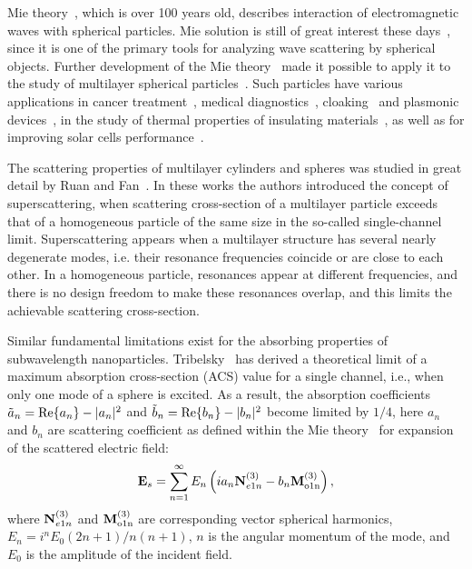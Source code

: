 \documentclass[aps,prl,twocolumn,showpacs,superscriptaddress,groupedaddress]{revtex4-1}  %
\begin{document}
\maketitle %

Mie theory~\cite{Mie-1908}, which is over 100 years old, describes
interaction of electromagnetic waves with spherical particles. Mie
solution is still of great interest these
days~\cite{Suzuki-2008,MacKowski-2012,Lerme-2000,Xu-2005,Li-2006,Gogoi-2010,Santiago-2011},
since it is one of the primary tools for analyzing wave scattering by
spherical objects. Further development of the Mie
theory~\cite{Yang-2003, Pena-scattnlay-2009} made it possible to apply
it to the study of multilayer spherical
particles~\cite{Sheehan-2013,Selmke-2012}.  Such particles have
various applications in cancer treatment~\cite{Zhang-2010,
  Hirsch-2003}, medical diagnostics~\cite{Allain-2002},
cloaking~\cite{Qui-2009, Semouchkina-2013, Ladutenko-2014} and
plasmonic devices~\cite{Martin-2013, Alu-2005}, in the study of
thermal properties of insulating materials~\cite{Xie-2013}, as well as
for improving solar cells performance~\cite{Kameya-2011,Mann-2011}.

The scattering properties of multilayer cylinders and spheres was
studied in great detail by Ruan and Fan~\cite{Fan-2010,Fan-2011}.  In
these works the authors introduced the concept of superscattering,
when scattering cross-section of a multilayer particle exceeds that of
a homogeneous particle of the same size in the so-called
single-channel limit. Superscattering appears when a multilayer
structure has several nearly degenerate modes, i.e. their resonance
frequencies coincide or are close to each other. In a homogeneous
particle, resonances appear at different frequencies, and there is no
design freedom to make these resonances overlap, and this limits the
achievable scattering cross-section.

Similar fundamental limitations exist for the absorbing properties of
subwavelength nanoparticles.  Tribelsky~\cite{Tribelsky-2011} has
derived a theoretical limit of a maximum absorption cross-section
(ACS) value for a single channel, i.e., when only one mode of a sphere
is excited.  As a result, the absorption coefficients $\tilde{a}_n=
{\rm Re}\{a_n\} - |a_n|^2 $ and $\tilde{b}_n= {\rm Re}\{b_n\} -
|b_n|^2 $ become limited by $1/4$, here $a_n$ and $b_n$ are scattering
coefficient as defined within the Mie theory~\cite{Bohren-1983} for
expansion of the scattered electric field:
$$ 
{\rm \mathbf{E}}_s = \sum_{n=1}^{\infty} E_n \left( i a_n {\rm
    \mathbf{N}}_{e1n}^{(3)} - b_n{\rm\mathbf{M}_{o1n}^{(3)}} \right),
$$
where ${\rm \mathbf{N}}_{e1n}^{(3)}$ and ${\rm\mathbf{M}_{o1n}^{(3)}}$
are corresponding vector spherical harmonics,
$E_n=i^nE_0(2n+1)/n(n+1)$, $n$ is the angular momentum of the mode,
and $E_0$ is the amplitude of the incident field.
\end{document}
